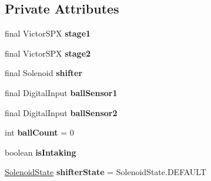 \subsection*{Private Attributes}
\begin{DoxyCompactItemize}
\item 
\mbox{\label{classfrc_1_1robot_1_1subsystems_1_1_storage_a1d336f2d61b7472bbb8d590c77f6e66b}} 
final Victor\+S\+PX {\bfseries stage1}
\item 
\mbox{\label{classfrc_1_1robot_1_1subsystems_1_1_storage_a4b8bbb74237cd1c90f5285cbebd86047}} 
final Victor\+S\+PX {\bfseries stage2}
\item 
\mbox{\label{classfrc_1_1robot_1_1subsystems_1_1_storage_a89858e41a488b7b4e4973817d9ea618b}} 
final Solenoid {\bfseries shifter}
\item 
\mbox{\label{classfrc_1_1robot_1_1subsystems_1_1_storage_a3649aff40d2058a0ed0eb8e3bbd9ed50}} 
final Digital\+Input {\bfseries ball\+Sensor1}
\item 
\mbox{\label{classfrc_1_1robot_1_1subsystems_1_1_storage_ab388628e9eff63f13f908e02ae7e0dff}} 
final Digital\+Input {\bfseries ball\+Sensor2}
\item 
\mbox{\label{classfrc_1_1robot_1_1subsystems_1_1_storage_a24f418210489169f4cf1a8073f8fb6c2}} 
int {\bfseries ball\+Count} = 0
\item 
\mbox{\label{classfrc_1_1robot_1_1subsystems_1_1_storage_a34f48281c32a147cf3ab79ffe83ed95c}} 
boolean {\bfseries is\+Intaking}
\item 
\mbox{\label{classfrc_1_1robot_1_1subsystems_1_1_storage_ab458c1bfab3b67e006781b853fda4edb}} 
\mbox{\hyperlink{enumfrc_1_1robot_1_1enums_1_1_solenoid_state}{Solenoid\+State}} {\bfseries shifter\+State} = Solenoid\+State.\+D\+E\+F\+A\+U\+LT
\item 
\mbox{\label{classfrc_1_1robot_1_1subsystems_1_1_storage_a932677c743e6fee5578a0f1b631fb31e}} 

\end{DoxyCompactItemize}
